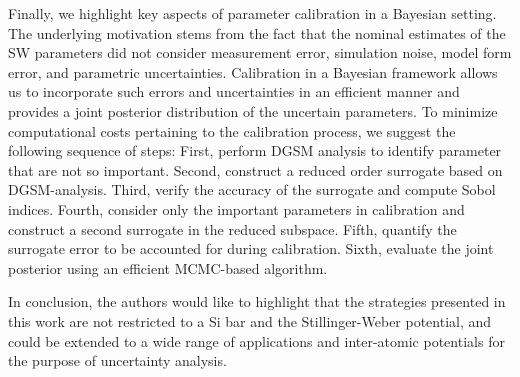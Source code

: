 Finally, we highlight key aspects of parameter calibration in a Bayesian setting.
The underlying motivation stems from the fact that the nominal estimates of the SW
parameters did not consider measurement error, simulation noise, model form error,
and parametric uncertainties. Calibration in a Bayesian framework allows us to
incorporate such errors and uncertainties in an efficient manner and provides
a joint posterior distribution of the uncertain parameters. To minimize computational
costs pertaining to the calibration process, we suggest the following sequence of
steps: First, perform DGSM analysis to 
identify parameter that are not so important. Second, construct a reduced order
surrogate based on DGSM-analysis. Third, verify the accuracy of the surrogate
and compute Sobol indices. Fourth, consider only the important parameters in
calibration and construct a second surrogate in the reduced subspace. Fifth,
quantify the surrogate error to be accounted for during calibration. Sixth,
evaluate the joint posterior using an efficient MCMC-based algorithm.

In conclusion, the authors would like to highlight that the strategies presented 
in this work are not restricted to a Si bar and the Stillinger-Weber potential, and
could be extended to a wide range of applications and inter-atomic potentials for
the purpose of uncertainty analysis. 

